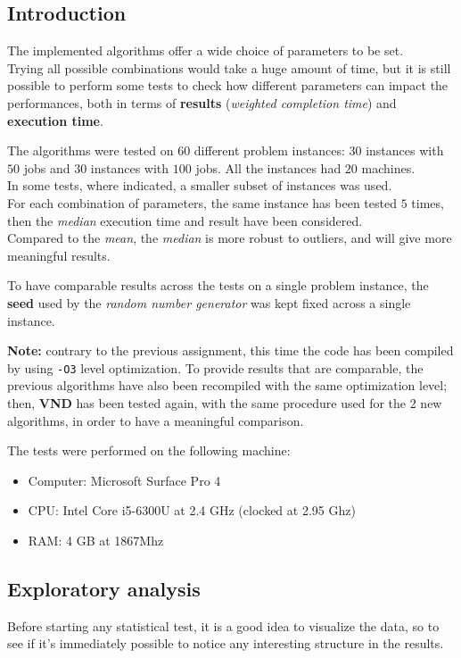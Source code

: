 \documentclass[
12pt,
a4paper,
oneside,
headinclude,
footinclude]{article}
\theoremstyle{definition} %
\begin{document}
\subsection{Introduction}
The implemented algorithms offer a wide choice of parameters to be set.\\
Trying all possible combinations would take a huge amount of time, but it is still possible to perform some tests to check how different parameters can impact the performances, both in terms of \textbf{results} (\textit{weighted completion time})  and \textbf{execution time}.

The algorithms were tested on $60$ different problem instances: $30$ instances with $50$ jobs and $30$ instances with $100$ jobs.
All the instances had $20$ machines. \\
In some tests, where indicated, a smaller subset of instances was used. \\
For each combination of parameters, the same instance has been tested $5$ times, then the \textit{median} execution time and result have been considered. \\
Compared to the \textit{mean}, the \textit{median} is more robust to outliers, and will give more meaningful results.

To have comparable results across the tests on a single problem instance, the \textbf{seed} used by the \textit{random number generator} was kept fixed across a single instance.

\textbf{Note:} contrary to the previous assignment, this time the code has been compiled by using \texttt{-O3} level optimization. To provide results that are comparable, the previous algorithms have also been recompiled with the same optimization level; then, \textbf{VND} has been tested again, with the same procedure used for the 2 new algorithms, in order to have a meaningful comparison.

The tests were performed on the following machine:
\begin{itemize}
    \item Computer: Microsoft Surface Pro 4
    \item CPU: Intel Core i5-6300U at 2.4 GHz (clocked at 2.95 Ghz)
    \item RAM: 4 GB at 1867Mhz
\end{itemize}
 
\newpage 
 
\subsection{Exploratory analysis}
Before starting any statistical test, it is a good idea to visualize the data, so to see if it's immediately possible to notice any interesting structure in the results.
\end{document}
